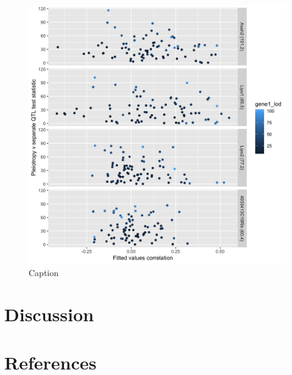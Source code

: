 \documentclass{article}
\begin{document}
\begin{figure}
    \centering
    \includegraphics[width = \textwidth]{2018-12-04_lrt-v-corr.jpg}
    \caption{Caption}
    \label{fig:cor}
\end{figure}

\section{Discussion}





\section{References}

\printbibliography
\end{document}

